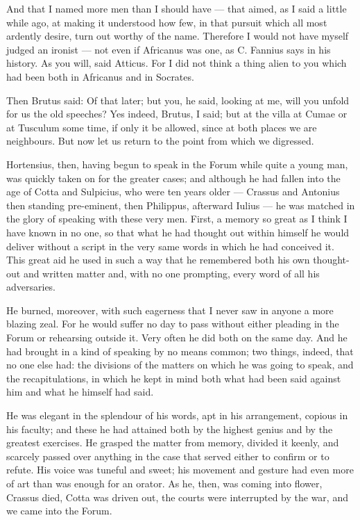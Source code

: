  And that I named more men than I should have — that aimed, as I said a little while ago, at making it understood how few, in that pursuit which all most ardently desire, turn out worthy of the name. Therefore I would not have myself judged an ironist — not even if Africanus was one, as C. Fannius says in his history. As you will, said Atticus. For I did not think a thing alien to you which had been both in Africanus and in Socrates.

 Then Brutus said: Of that later; but you, he said, looking at me, will you unfold for us the old speeches? Yes indeed, Brutus, I said; but at the villa at Cumae or at Tusculum some time, if only it be allowed, since at both places we are neighbours. But now let us return to the point from which we digressed.

 Hortensius, then, having begun to speak in the Forum while quite a young man, was quickly taken on for the greater cases; and although he had fallen into the age of Cotta and Sulpicius, who were ten years older — Crassus and Antonius then standing pre-eminent, then Philippus, afterward Iulius — he was matched in the glory of speaking with these very men. First, a memory so great as I think I have known in no one, so that what he had thought out within himself he would deliver without a script in the very same words in which he had conceived it. This great aid he used in such a way that he remembered both his own thought-out and written matter and, with no one prompting, every word of all his adversaries.

 He burned, moreover, with such eagerness that I never saw in anyone a more blazing zeal. For he would suffer no day to pass without either pleading in the Forum or rehearsing outside it. Very often he did both on the same day. And he had brought in a kind of speaking by no means common; two things, indeed, that no one else had: the divisions of the matters on which he was going to speak, and the recapitulations, in which he kept in mind both what had been said against him and what he himself had said.

 He was elegant in the splendour of his words, apt in his arrangement, copious in his faculty; and these he had attained both by the highest genius and by the greatest exercises. He grasped the matter from memory, divided it keenly, and scarcely passed over anything in the case that served either to confirm or to refute. His voice was tuneful and sweet; his movement and gesture had even more of art than was enough for an orator. As he, then, was coming into flower, Crassus died, Cotta was driven out, the courts were interrupted by the war, and we came into the Forum.

